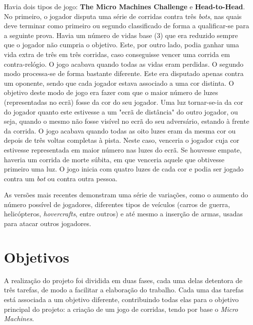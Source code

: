 \documentclass[a4paper]{report} %
\begin{document}
  \hspace{1cm}
  
  \par \noindent Havia dois tipos de jogo: \textbf{The Micro Machines Challenge} e \textbf{Head-to-Head}. No primeiro, o jogador disputa uma série de corridas contra três \textit{bots}, nas quais deve terminar como primeiro ou segundo classificado de forma a qualificar-se para a seguinte prova. Havia um número de vidas base (3) que era reduzido sempre que o jogador não cumpria o objetivo. Este, por outro lado, podia ganhar uma vida extra de três em três corridas, caso conseguisse vencer uma corrida em contra-relógio. O jogo acabava quando todas as vidas eram perdidas. O segundo modo processa-se de forma bastante diferente. Este era disputado apenas contra um oponente, sendo que cada jogador estava associado a uma cor distinta. O objetivo deste modo de jogo era fazer com que o maior número de luzes (representadas no ecrã) fosse da cor do seu jogador. Uma luz tornar-se-ia da cor do jogador quanto este estivesse a um "ecrã de distância" do outro jogador, ou seja, quando o mesmo não fosse visível no ecrã do seu adversário, estando à frente da corrida. O jogo acabava quando todas as oito luzes eram da mesma cor ou depois de três voltas completas à pista. Neste caso, venceria o jogador cuja cor estivesse representada em maior número nas luzes do ecrã. Se houvesse empate, haveria um corrida de morte súbita, em que venceria aquele que obtivesse primeiro uma luz. O jogo inicia com quatro luzes de cada cor e podia ser jogado contra um \textit{bot} ou contra outra pessoa.
  
  \hspace{1cm}
  
  \par \noindent As versões mais recentes demonstram uma série de variações, como o aumento do número possível de jogadores, diferentes tipos de veículos (carros de guerra, helicópteros, \textit{hovercrafts}, entre outros) e até mesmo a inserção de armas, usadas para atacar outros jogadores.
  
  \newpage
  
  \section{Objetivos}
  
  A realização do projeto foi dividida em duas fases, cada uma delas detentora de três tarefas, de modo a facilitar a elaboração do trabalho. Cada uma das tarefas está associada a um objetivo diferente, contribuindo todas elas para o objetivo principal do projeto: a criação de um jogo de corridas, tendo por base o \textit{Micro Machines}.
  
\end{document}
